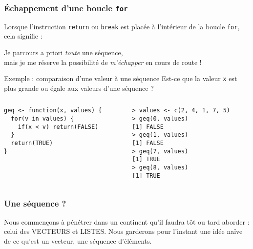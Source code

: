 \documentclass[10pt]{beamer}
\begin{document}
\begin{frame}[fragile]
  \frametitle{Échappement d'une boucle \texttt{for}}
  Lorsque l'instruction \texttt{return} ou \texttt{break} est placée à l'intérieur de la boucle \texttt{for}, cela signifie :
  \begin{center}
    \alert{Je parcours a priori \emph{toute} une séquence,\\ mais je me réserve la possibilité de \emph{m'échapper} en cours de route !}

  \end{center}
\begin{exampleblock}{Exemple : comparaison d'une valeur à une séquence}
  Est-ce que la valeur \texttt{x} est plus grande ou égale aux valeurs d’une séquence ?
\begin{columns}[t]
\begin{column}{0.48\textwidth}
  \begin{lstlisting}[style=editor]
geq <- function(x, values) {
  for(v in values) {
    if(x < v) return(FALSE)
  }
  return(TRUE)
}
  \end{lstlisting}
\end{column}
\begin{column}{0.48\textwidth}
  \begin{lstlisting}
> values <- c(2, 4, 1, 7, 5)
> geq(0, values)
[1] FALSE
> geq(1, values)
[1] FALSE
> geq(7, values)
[1] TRUE
> geq(8, values)
[1] TRUE
\end{lstlisting}

\end{column}
\end{columns}
\end{exampleblock}
\end{frame}

\begin{frame}
  \frametitle{Une séquence ?}
  Nous commençons à pénétrer dans un continent qu'il faudra tôt ou tard aborder : celui des \alert{VECTEURS} et \alert{LISTES}.
  Nous garderons pour l'instant une idée naïve de ce qu'est un vecteur, une \alert{séquence d’éléments}.
\end{frame}
\end{document}
